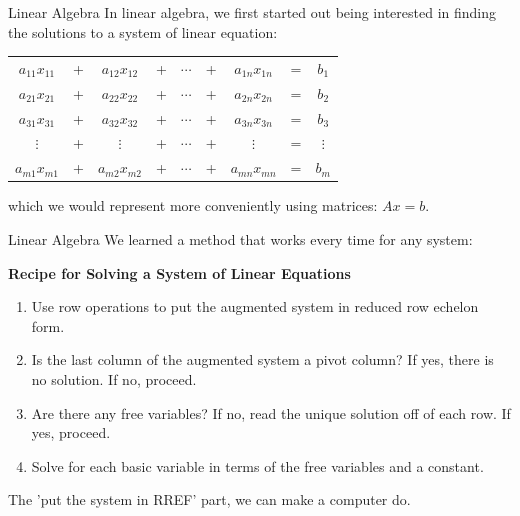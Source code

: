 \documentclass[11pt, xcolor={dvipsnames}, hyperref={colorlinks, allcolors=Blue}]{beamer}
\begin{document}
\begin{frame}{Linear Algebra}
In linear algebra, we first started out being interested in finding the solutions to a system of linear equation:

\begin{center}
\begin{tabular}{c c c c c c c c c}
$a_{11}x_{11}$   &+&   $a_{12}x_{12}$      &+&    $\cdots$    &+&    $a_{1n}x_{1n}$   &=& $b_1$\\
$a_{21}x_{21}$   &+&   $a_{22}x_{22}$      &+ &   $\cdots$    &+&    $a_{2n}x_{2n}$   &=& $b_2$\\
$a_{31}x_{31}$   &+&   $a_{32}x_{32}$      &+&    $\cdots$    &+&    $a_{3n}x_{3n}$   &=& $b_3$\\
$\vdots$               &+&        $\vdots$                &+&    $\cdots$    &+&    $\vdots$               &=&  $\vdots$\\
$a_{m1}x_{m1}$  &+&   $a_{m2}x_{m2}$   &+&    $\cdots$    &+&    $a_{mn}x_{mn}$ &=& $b_m$
\end{tabular}
\end{center}
\bigskip

which we would represent more conveniently using matrices: $Ax = b$.
\end{frame}

\begin{frame}{Linear Algebra}
We learned a method that works every time for any system:

\begin{center}
\textbf{Recipe for Solving a System of Linear Equations}
\end{center}

\begin{enumerate}[1.]
\item Use row operations to put the augmented system in reduced row echelon form.
\item Is the last column of the augmented system a pivot column? If yes, there is no solution. If no, proceed.
\item Are there any free variables? If no, read the unique solution off of each row. If yes, proceed.
\item Solve for each basic variable in terms of the free variables and a constant. 
\end{enumerate}
\bigskip

The 'put the system in RREF' part, we can make a computer do.
\end{frame}
\end{document}
